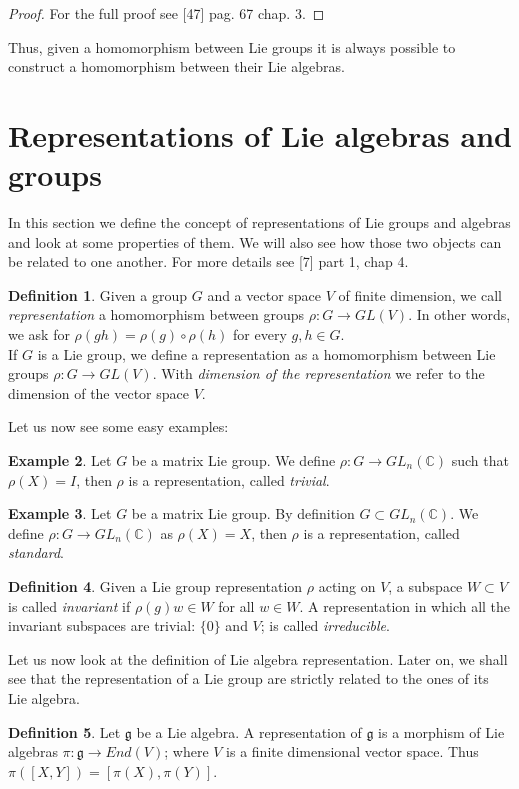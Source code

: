 \documentclass[12pt,a4paper]{report}
\theoremstyle{definition}
\newtheorem{Def}{Definition}[chapter]
\theoremstyle{Theorem}
\theoremstyle{definition}
\newtheorem{Ex}[Def]{Example}
\theoremstyle{definition}
\begin{document}
	\begin{proof}
		For the full proof see [47] pag. 67 chap. 3.
	\end{proof}
	Thus, given a homomorphism between Lie groups it is always possible to construct a homomorphism between their Lie algebras.
	\section{Representations of Lie algebras and groups}
	In this section we define the concept of representations of Lie groups and algebras and look at some properties of them. We will also see how those two objects can be related to one another. For more details see [7] part 1, chap 4.
	\begin{Def}
		Given a group $G$ and a vector space $V$ of finite dimension, we call \textit{representation} a homomorphism between groups $\rho:G\rightarrow GL(V)$. In other words, we ask for $\rho(gh)=\rho(g)\circ\rho(h)$ for every $g,h\in G$.\\
		If $G$ is a Lie group, we define a representation as a homomorphism between Lie groups $\rho:G\rightarrow GL(V)$. With \textit{dimension of the representation} we refer to the dimension of the vector space $V$.
	\end{Def}Let us now see some easy examples:
	\begin{Ex}
		Let $G$ be a matrix Lie group. We define $\rho: G\rightarrow GL_n(\mathbb{C})$ such that $\rho(X)=I$, then $\rho$ is a representation, called \textit{trivial}. 
	\end{Ex}
	\begin{Ex}
		Let $G$ be a matrix Lie group. By definition $G\subset GL_n(\mathbb{C})$. We define $\rho: G\rightarrow GL_n(\mathbb{C})$ as $\rho(X)=X$, then $\rho$ is a representation, called \textit{standard}. 
	\end{Ex}
	\begin{Def}
		Given a Lie group representation $\rho$ acting on $V$, a subspace $W\subset V$ is called \textit{invariant} if $\rho(g)w\in W$ for all $w\in W$.
		A representation in which all the invariant subspaces are trivial: $\{0\}$ and $V$; is called \textit{irreducible}.
	\end{Def}
	Let us now look at the definition of Lie algebra representation. Later on, we shall see that the representation of a Lie group are strictly related to the ones of its Lie algebra.
	\begin{Def}
		Let $\mathfrak{g}$ be a Lie algebra. A representation of $\mathfrak{g}$ is a morphism of Lie algebras $\pi:\mathfrak{g}\rightarrow End(V)$; where $V$ is a finite dimensional vector space. Thus $\pi([X,Y])=[\pi(X),\pi(Y)]$.
	\end{Def}
\end{document}
